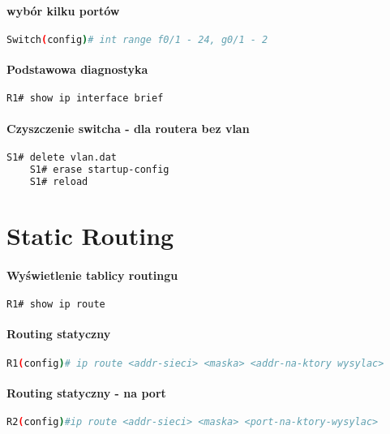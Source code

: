 \documentclass[12pt]{article}
\begin{document}
	\paragraph{wybór kilku portów}
	\begin{lstlisting}[language=bash]
	Switch(config)# int range f0/1 - 24, g0/1 - 2
	\end{lstlisting}
	
	\paragraph{Podstawowa diagnostyka}
	\begin{lstlisting}[language=bash]
	R1# show ip interface brief
	\end{lstlisting}
	
	\paragraph{Czyszczenie switcha - dla routera bez vlan}
	\begin{lstlisting}[language=bash]	
	S1# delete vlan.dat
	S1# erase startup-config 
	S1# reload
	\end{lstlisting}
		
\newpage

\section{Static Routing}
		
	\paragraph{Wyświetlenie tablicy routingu}
	\begin{lstlisting}[language=bash]
	R1# show ip route
	\end{lstlisting}
		
	\paragraph{Routing statyczny}
	\begin{lstlisting}[language=bash]
	R1(config)# ip route <addr-sieci> <maska> <addr-na-ktory wysylac>
	\end{lstlisting}
		
	\paragraph{Routing statyczny - na port}
	\begin{lstlisting}[language=bash]
	R2(config)#ip route <addr-sieci> <maska> <port-na-ktory-wysylac>
	\end{lstlisting}
		
\end{document}
